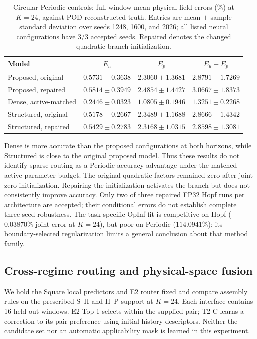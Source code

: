 \begin{table}[H]
\centering
\caption{Circular Periodic controls: full-window mean physical-field
errors (\%) at $K=24$, against POD-reconstructed truth. Entries are mean
$\pm$ sample standard deviation over seeds 1248, 1600, and 2026; all
listed neural configurations have 3/3 accepted seeds. Repaired denotes
the changed quadratic-branch initialization.}
\label{tab:circular_full_reorg}
\small
\setlength{\tabcolsep}{4pt}
\begin{tabular}{@{}lccc@{}}
\toprule
Model & $E_u$ & $E_p$ & $E_u+E_p$\\
\midrule
Proposed, original & $0.5731\pm0.3638$ & $2.3060\pm1.3681$ & $2.8791\pm1.7269$\\
Proposed, repaired & $0.5814\pm0.3949$ & $2.4854\pm1.4427$ & $3.0667\pm1.8373$\\
Dense, active-matched & $\mathbf{0.2446\pm0.0323}$ & $\mathbf{1.0805\pm0.1946}$ & $\mathbf{1.3251\pm0.2268}$\\
Structured, original & $0.5178\pm0.2667$ & $2.3489\pm1.1688$ & $2.8666\pm1.4342$\\
Structured, repaired & $0.5429\pm0.2783$ & $2.3168\pm1.0315$ & $2.8598\pm1.3081$\\
\bottomrule
\end{tabular}
\end{table}

Dense is more accurate than the proposed configurations at both
horizons, while Structured is close to the original proposed model.
Thus these results do not identify sparse routing as a Periodic
accuracy advantage under the matched active-parameter budget.
The original quadratic factors remained zero after joint zero
initialization. Repairing the initialization activates the branch
but does not consistently improve accuracy.
Only two of three repaired FP32 Hopf runs per architecture are
accepted; their conditional errors do not establish complete
three-seed robustness.
The task-specific OpInf fit is competitive on Hopf
($0.03870\%$ joint error at $K=24$), but poor on Periodic
($114.0941\%$); its boundary-selected regularization limits a
general conclusion about that method family.

\subsection{Cross-regime routing and physical-space fusion}
\label{sec:exp_fusion}

We hold the Square local predictors and E2 router fixed and compare
assembly rules on the prescribed S--H and H--P support at $K=24$.
Each interface contains 16 held-out windows.
E2 Top-1 selects within the supplied pair; T2-C learns a correction
to its pair preference using initial-history descriptors.
Neither the candidate set nor an automatic applicability mask is
learned in this experiment.

